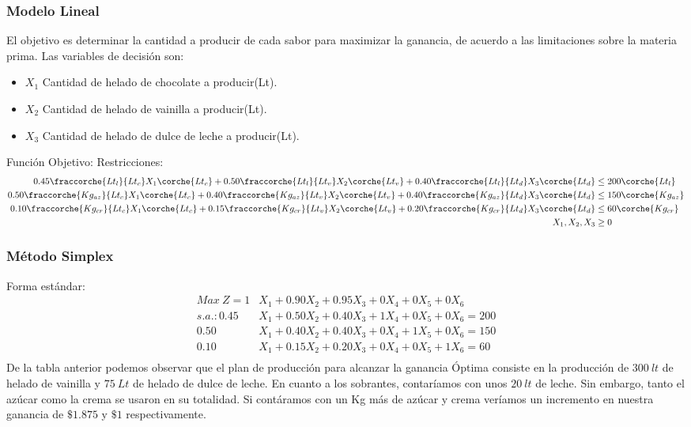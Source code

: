 
\begin{homeworkProblem}[-1][Heladería]

\subsubsection{Modelo Lineal}
El objetivo es determinar la cantidad a producir de cada sabor para maximizar la ganancia, de acuerdo a las limitaciones sobre la materia prima.
Las variables de decisión son:
\begin{itemize}
  \item $X_1$ Cantidad de helado de chocolate a producir(Lt).
  \item $X_2$ Cantidad de helado de vainilla a producir(Lt).
  \item $X_3$ Cantidad de helado de dulce de leche a producir(Lt).
\end{itemize}
Función Objetivo: 
Restricciones:
\begin{align*}
    0.45\fraccorche{Lt_l}{Lt_c}X_1\corche{Lt_c} + 0.50\fraccorche{Lt_l}{Lt_v}X_2\corche{Lt_v} + 0.40\fraccorche{Lt_l}{Lt_d}X_3\corche{Lt_d} &\le 200\corche{Lt_l} \\
    0.50\fraccorche{Kg_{az}}{Lt_c}X_1\corche{Lt_c} + 0.40\fraccorche{Kg_{az}}{Lt_v}X_2\corche{Lt_v} + 0.40\fraccorche{Kg_{az}}{Lt_d}X_3\corche{Lt_d} &\le 150\corche{Kg_{az}} \\
    0.10\fraccorche{Kg_{cr}}{Lt_c}X_1\corche{Lt_c} + 0.15\fraccorche{Kg_{cr}}{Lt_v}X_2\corche{Lt_v} + 0.20\fraccorche{Kg_{cr}}{Lt_d}X_3\corche{Lt_d} &\le 60\corche{Kg_{cr}} \\
    X_1,X_2,X_3 &\ge 0
\end{align*}

\subsubsection{Método Simplex}
Forma estándar:
\begin{align*}
    Max\ Z = 1&X_1 + 0.90X_2 + 0.95X_3 + 0X_4 + 0X_5 +0X_6 \\
    s.a.: 0.45&X_1 + 0.50X_2 + 0.40X_3 + 1X_4 + 0X_5 + 0X_6 = 200 \\
    0.50&X_1 + 0.40X_2 + 0.40X_3 + 0X_4 + 1X_5 + 0X_6 = 150 \\
    0.10&X_1 + 0.15X_2 + 0.20X_3 + 0X_4 + 0X_5 + 1X_6 = 60\\
\end{align*}
De la tabla anterior podemos observar que el plan de producción para alcanzar la ganancia Óptima consiste en la producción de $300\ lt$ de helado de vainilla y $75\ Lt$ de helado de dulce de leche. En cuanto a los sobrantes, contaríamos con unos $20\ lt$ de leche. Sin embargo, tanto el azúcar como la crema se usaron en su totalidad. Si contáramos con un Kg más de azúcar y crema veríamos un incremento en nuestra ganancia de $\$1.875$ y $\$1$ respectivamente.


\end{homeworkProblem}
